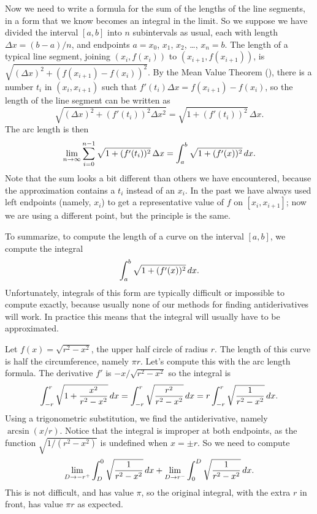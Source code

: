 Now we need to write a formula for the sum of the lengths of the line
segments, in a form that we know becomes an integral in the limit.  So
we suppose we have divided the interval $[a,b]$ into $n$ subintervals
as usual, each with length $\Delta x =(b-a)/n$, and endpoints $
a=x_0$, $x_1$, $x_2$, \dots, $x_n=b$.  The length of a
typical line segment, joining $(x_i,f(x_i))$ to $
(x_{i+1},f(x_{i+1}))$, is $\sqrt{(\Delta x )^2
  +(f(x_{i+1})-f(x_i))^2}$.  By the Mean Value Theorem
(), there is a number $t_i$ in $(x_i,x_{i+1})$
such that $f'(t_i)\Delta x=f(x_{i+1})-f(x_i)$, so the length of
the line segment can be written as
$$
  \sqrt{(\Delta x)^2 + (f'(t_i))^2\Delta x^2}=
  \sqrt{1+(f'(t_i))^2}\,\Delta x.
$$
The arc length is then
$$
  \lim_{n\to\infty}\sum_{i=0}^{n-1} \sqrt{1+(f'(t_i))^2}\,\Delta x=
  \int_a^b \sqrt{1+(f'(x))^2}\, d x.
$$
Note that the sum looks a bit different than others we have
encountered, because the approximation contains a $t_i$ instead of an
$x_i$. In the past we have always used left endpoints (namely, $x_i$)
to get a representative value of $f$ on $[x_i,x_{i+1}]$; now we are
using a different point, but the principle is the same.

To summarize, to compute the length of a curve on the interval
$[a,b]$, we compute the integral
$$\int_a^b \sqrt{1+(f'(x))^2}\, d x.$$ 
Unfortunately, integrals of this form are typically difficult or
impossible to compute exactly, because usually none of our methods for
finding antiderivatives will work. In practice this means that the
integral will usually have to be approximated.


\begin{example} Let $f(x) = \sqrt{r^2-x^2}$, the upper half circle of radius
$r$. The length of this curve is half the circumference, namely $\pi
r$. Let's compute this with the arc length formula.
The derivative $f'$ is $-x/\sqrt{r^2-x^2}$ so the integral is
$$
  \int_{-r}^r \sqrt{1+{x^2\over r^2-x^2}}\, d x
  =\int_{-r}^r \sqrt{r^2\over r^2-x^2}\, d x
  =r\int_{-r}^r \sqrt{1\over r^2-x^2}\, d x.
$$
Using a trigonometric substitution, we find the antiderivative, namely
$\arcsin(x/r)$. Notice that the integral is improper at both
endpoints, as the function $\sqrt{1/(r^2-x^2)}$ is undefined when
$x=\pm r$. So we need to compute
$$
  \lim_{D\to-r^+}\int_D^0  \sqrt{1\over r^2-x^2}\, d x +
  \lim_{D\to r^-}\int_0^D  \sqrt{1\over r^2-x^2}\, d x.
$$
This is not difficult, and has value $\pi$, so the original integral,
with the extra $r$ in front, has value $\pi r$ as expected.
\end{example}

